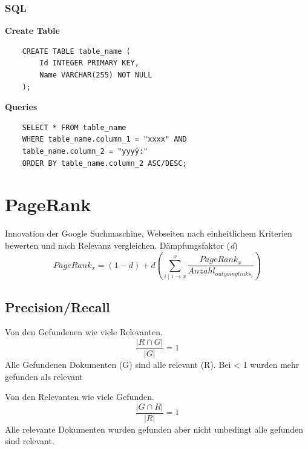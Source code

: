 \subsubsection{SQL}

\textbf{Create Table}
\begin{verbatim}
    CREATE TABLE table_name (
        Id INTEGER PRIMARY KEY, 
        Name VARCHAR(255) NOT NULL
    );
\end{verbatim}

\textbf{Queries}

\begin{verbatim}
    SELECT * FROM table_name
    WHERE table_name.column_1 = "xxxx" AND
    table_name.column_2 = "yyyÿ:"
    ORDER BY table_name.column_2 ASC/DESC;
\end{verbatim}

\section{PageRank}
\begin{definition}
    Innovation der Google Suchmaschine, Webseiten nach einheitlichem Kriterien bewerten und nach Relevanz vergleichen. Dämpfungsfaktor (\textit{d}) 
    \begin{equation}
        PageRank_x = (1-d) + d(\sum_{i \mid i \rightarrow x}^{x}\frac{PageRank_x}{Anzahl_{outgoinglinks_i}})
    \end{equation}
\end{definition}

\subsection{Precision/Recall}

\begin{definition}
    [Precision] Von den Gefundenen wie viele Relevanten. 
    \begin{equation}
        \frac{|R \cap G |}{|G|} = 1
    \end{equation}
    Alle Gefundenen Dokumenten (G) sind alle relevant (R). Bei < 1 wurden mehr gefunden als relevant 
\end{definition}

\begin{definition}
    [Recall] Von den Relevanten wie viele Gefunden.
      \begin{equation}
          \frac{|G \cap R |}{|R|} = 1
      \end{equation}
       Alle relevante Dokumenten wurden gefunden aber nicht unbedingt alle gefunden sind relevant.
\end{definition}



